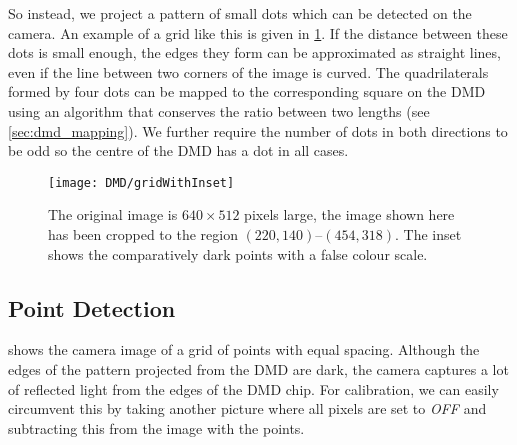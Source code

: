 So instead, we project a pattern of small dots which can be detected on the camera. An example of a grid like this is given in \cref{fig:point_matrix_example}. If the distance between these dots is small enough, the edges they form can be approximated as straight lines, even if the line between two corners of the image is curved. The quadrilaterals formed by four dots can be mapped to the corresponding square on the DMD using an algorithm that conserves the ratio between two lengths (see \cref{sec:dmd_mapping}). We further require the number of dots in both directions to be odd so the centre of the DMD has a dot in all cases.

\vfill
\begin{figure}[htbp]
    \centering
    \texttt{[image: DMD/gridWithInset]}
    \caption[Camera image of a grid with 165 equally spaced points]{The original image is $640\times 512$ pixels large, the image shown here has been cropped to the region $(220,140)$--$(454,318)$. The inset shows the comparatively dark points with a false colour scale.}
    \label{fig:point_matrix_example}
\end{figure}
\vfill
\pagebreak

\subsection{Point Detection}
 shows the camera image of a grid of points with equal spacing. Although the edges of the pattern projected from the DMD are dark, the camera captures a lot of reflected light from the edges of the DMD chip. For calibration, we can easily circumvent this by taking another picture where all pixels are set to \emph{OFF} and subtracting this from the image with the points.

